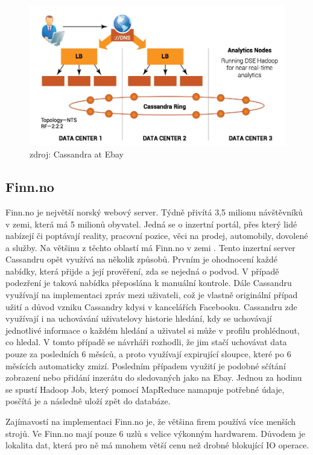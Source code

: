 \begin{figure}[h]
\centering
\includegraphics[scale=0.4]{images/ebay}
\caption{zdroj:  Cassandra at Ebay \cite{ebay}}
\label{fig:timeseries1}
\end{figure}

\subsection{Finn.no}
Finn.no je největší norský webový server. Týdně přivítá 3,5 milionu návštěvníků v zemi, která má 5 milionů obyvatel. Jedná se o inzertní portál, přes který lidé nabízejí či poptávají reality, pracovní pozice, věci na prodej, automobily, dovolené a služby. Na většinu z těchto oblastí má Finn.no v zemi . Tento inzertní server Cassandru opět využívá na několik způsobů. Prvním je ohodnocení každé nabídky, která přijde a její prověření, zda se nejedná o podvod. V případě podezření je taková nabídka přeposlána k manuální kontrole. Dále Cassandru využívají na implementaci zpráv mezi uživateli, což je vlastně originální případ užití a důvod vzniku Cassandry kdysi v kancelářích Facebooku. Cassandru zde využívají i na uchovávání uživatelovy historie hledání, kdy se uchovávají jednotlivé informace o každém hledání a uživatel si může v profilu prohlédnout, co hledal. V tomto případě se návrháři rozhodli, že jim stačí uchovávat data pouze za posledních 6 měsíců, a proto využívají expirující sloupce, které po 6 měsících automaticky zmizí. Posledním případem využití je podobné sčítání zobrazení nebo přidání inzerátu do sledovaných jako na Ebay. Jednou za hodinu se spustí Hadoop Job, který pomocí MapReduce namapuje potřebné údaje, posčítá je a následně uloží zpět do databáze.

Zajímavostí na implementaci Finn.no je, že většina firem používá více menších strojů. Ve Finn.no mají pouze 6 uzlů s velice výkonným hardwarem. Důvodem je lokalita dat, která pro ně má mnohem větší cenu než drobné blokující IO operace. 

